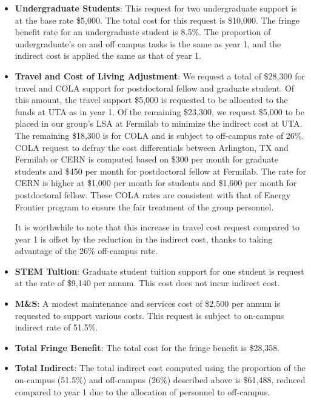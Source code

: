 \begin{enumerate}
\begin{itemize}[noitemsep,nolistsep]
\item {{\bf Undergraduate Students}: This request for two undergraduate support is at the base rate \$5,000.  The total cost for this request is \$10,000.  The fringe benefit rate for an undergraduate student is 8.5\%.  The proportion of undergraduate’s on and off campus tasks is the same as year 1, and the indirect cost is applied the same as that of year 1.}

\item{{\bf Travel and Cost of Living Adjustment}: We request a total of \$28,300 for travel and COLA support for postdoctoral fellow and graduate student.   Of this amount, the travel support \$5,000 is requested to be allocated to the funds at UTA as in year 1.  Of the remaining \$23,300, we request \$5,000 to be placed in our group’s LSA at Fermilab to minimize the indirect cost at UTA.   The remaining \$18,300 is for COLA and is subject to off-campus rate of 26\%.  COLA request to defray the cost differentials between Arlington, TX and Fermilab or CERN is computed based on \$300 per month for graduate students and \$450 per month for postdoctoral fellow at Fermilab.  The rate for CERN is higher at \$1,000 per month for students and \$1,600 per month for postdoctoral fellow.  These COLA rates are consistent with that of Energy Frontier program to ensure the fair treatment of the group personnel.  

It is worthwhile to note that this increase in travel cost request compared to year 1 is offset by the reduction in the indirect cost, thanks to taking advantage of the 26\% off-campus rate.}

\item {{\bf STEM Tuition}: Graduate student tuition support for one student is request at the rate of \$9,140 per annum.  This cost does not incur indirect cost.}

\item {{\bf M\&S}: A modest maintenance and services cost of \$2,500 per annum is requested to support various costs.   This request is subject to on-campus indirect rate of 51.5\%.}

\item {{\bf Total Fringe Benefit}: The total cost for the fringe benefit is \$28,358.}

\item {{\bf Total Indirect}: The total indirect cost computed using the proportion of the on-campus (51.5\%) and off-campus (26\%) described above is \$61,488, reduced compared to year 1 due to the allocation of personnel to off-campus.}


\end{itemize}
\end{enumerate}
